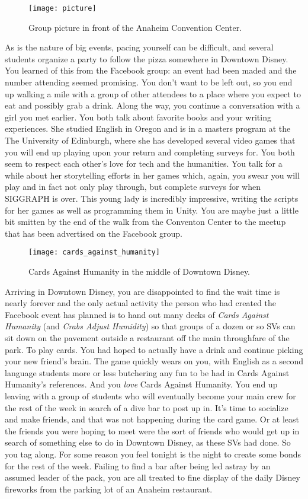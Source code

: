 \documentclass[../main.tex]{subfiles}
\begin{document}
\begin{figure}[h]
	\centering
	\texttt{[image: picture]}
	\caption*{Group picture in front of the Anaheim Convention Center.}
\end{figure}

As is the nature of big events, pacing yourself can be difficult, and several students organize a party to follow the pizza somewhere in Downtown Disney. You learned of this from the Facebook group: an event had been maded and the number attending seemed promising. You don't want to be left out, so you end up walking a mile with a group of other attendees to a place where you expect to eat and possibly grab a drink. Along the way, you continue a conversation with a girl you met earlier. You both talk about favorite books and your writing experiences. She studied English in Oregon and is in a masters program at the The University of Edinburgh, where she has developed several video games that you will end up playing upon your return and completing surveys for. You both seem to respect each other's love for tech and the humanities. You talk for a while about her storytelling efforts in her games which, again, you swear you will play and in fact not only play through, but complete surveys for when SIGGRAPH is over. This young lady is incredibly impressive, writing the scripts for her games as well as programming them in Unity. You are maybe just a little bit smitten by the end of the walk from the Conventon Center to the meetup that has been advertised on the Facebook group.

\begin{figure}[h]
	\centering
	\texttt{[image: cards\_against\_humanity]}
	\caption*{Cards Against Humanity in the middle of Downtown Disney.}
\end{figure}

Arriving in Downtown Disney, you are disappointed to find the wait time is nearly forever and the only actual activity the person who had created the Facebook event has planned is to hand out many decks of \textit{Cards Against Humanity} (and \textit{Crabs Adjust Humidity}) so that groups of a dozen or so SVs can sit down on the pavement outside a restaurant off the main throughfare of the park. To play cards. You had hoped to actually have a drink and continue picking your new friend's brain. The game quickly wears on you, with English as a second language students more or less butchering any fun to be had in Cards Against Humanity's references. And you \textit{love} Cards Against Humanity. You end up leaving with a group of students who will eventually become your main crew for the rest of the week in search of a dive bar to post up in. It's time to socialize and make friends, and that was not happening during the card game. Or at least the friends you were hoping to meet were the sort of friends who would get up in search of something else to do in Downtown Disney, as these SVs had done. So you tag along. For some reason you feel tonight is the night to create some bonds for the rest of the week. Failing to find a bar after being led astray by an assumed leader of the pack, you are all treated to fine display of the daily Disney fireworks from the parking lot of an Anaheim restaurant.
\end{document}
